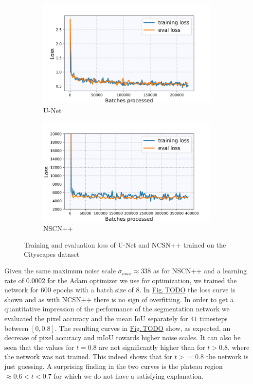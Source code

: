 %
\begin{figure}[] \label{fig:3.2}
    \centering
    \begin{subfigure}[b]{0.49\textwidth}
        \includegraphics[width=\textwidth]{Chapters/figures/experiments/cityscapes/loss_city_seg.jpg}
        \caption{U-Net}
    \end{subfigure}
    \begin{subfigure}[b]{0.49\textwidth}
        \includegraphics[width=\textwidth]{Chapters/figures/experiments/cityscapes/loss_city_ncsn.jpg}
        \caption{NSCN++}
    \end{subfigure}
    \caption[Losses of U-Net/NCSN++ on Cityscapes dataset]{Training and evaluation loss of U-Net and NCSN++ trained on the Cityscapes dataset}
\end{figure}
%
Given the same maximum noise scale $\sigma_{max}\approx338$ as for NSCN++ and a learning rate of $0.0002$ for the Adam optimizer \cite{adam} we use for optimization, we trained the network for $600$ epochs with a batch size of $8$. In \hyperref[fig:]{Fig.\,TODO} the loss curve is shown and as with NCSN++ there is no sign of overfitting. In order to get a quantitative impression of the performance of the segmentation network we evaluated the pixel accuracy and the mean IoU separately for $41$ timesteps between $[0 ,0.8]$. The resulting curves in \hyperref[fig:]{Fig.\,TODO} show, as expected, an decrease of pixel accuracy and mIoU towards higher noise scales. It can also be seen that the values for $t=0.8$ are not significantly higher than for $t>0.8$, where the network was not trained. This indeed shows that for $t>=0.8$ the network is just guessing. A surprising finding in the two curves is the plateau region $\approx0.6<t<0.7$ for which we do not have a satisfying explanation.
